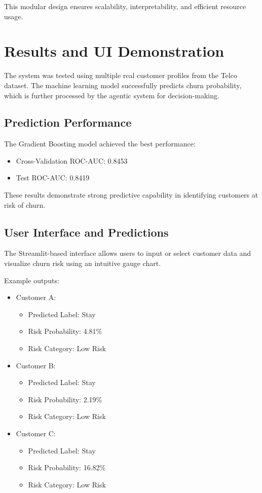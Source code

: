 \documentclass[conference]{IEEEtran}
\begin{document}
This modular design ensures scalability, interpretability, and efficient resource usage.

\section{Results and UI Demonstration}

The system was tested using multiple real customer profiles from the Telco dataset. The machine learning model successfully predicts churn probability, which is further processed by the agentic system for decision-making.

\subsection{Prediction Performance}

The Gradient Boosting model achieved the best performance:
\begin{itemize}[leftmargin=*]
\item Cross-Validation ROC-AUC: 0.8453
\item Test ROC-AUC: 0.8419
\end{itemize}

These results demonstrate strong predictive capability in identifying customers at risk of churn.

\subsection{User Interface and Predictions}

The Streamlit-based interface allows users to input or select customer data and visualize churn risk using an intuitive gauge chart.

Example outputs:
\begin{itemize}[leftmargin=*]
\item Customer A:
\begin{itemize}
\item Predicted Label: Stay
\item Risk Probability: 4.81\%
\item Risk Category: Low Risk
\end{itemize}

\item Customer B:
\begin{itemize}
\item Predicted Label: Stay
\item Risk Probability: 2.19\%
\item Risk Category: Low Risk
\end{itemize}

\item Customer C:
\begin{itemize}
\item Predicted Label: Stay
\item Risk Probability: 16.82\%
\item Risk Category: Low Risk
\end{itemize}
\end{itemize}
\end{document}

